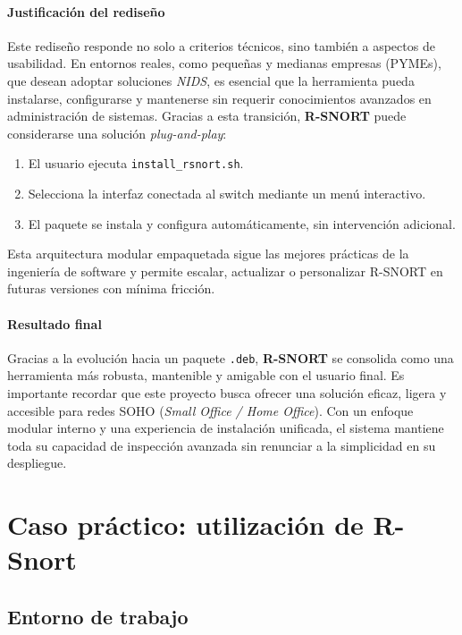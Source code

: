 \documentclass[11pt,a4paper,twoside]{report}
\begin{document}
\subsubsection{Justificación del rediseño}

Este rediseño responde no solo a criterios técnicos, sino también a aspectos de usabilidad. En entornos reales, como pequeñas y medianas empresas (PYMEs), que desean adoptar soluciones \textit{NIDS}, es esencial que la herramienta pueda instalarse, configurarse y mantenerse sin requerir conocimientos avanzados en administración de sistemas. Gracias a esta transición, \textbf{R-SNORT} puede considerarse una solución \textit{plug-and-play}:

\begin{enumerate}
	\item El usuario ejecuta \texttt{install\_rsnort.sh}.
	\item Selecciona la interfaz conectada al switch mediante un menú interactivo.
	\item El paquete se instala y configura automáticamente, sin intervención adicional.
\end{enumerate}

Esta arquitectura modular empaquetada sigue las mejores prácticas de la ingeniería de software y permite escalar, actualizar o personalizar R-SNORT en futuras versiones con mínima fricción.

\subsubsection{Resultado final}

Gracias a la evolución hacia un paquete \texttt{.deb}, \textbf{R-SNORT} se consolida como una herramienta más robusta, mantenible y amigable con el usuario final. Es importante recordar que este proyecto busca ofrecer una solución eficaz, ligera y accesible para redes SOHO (\textit{Small Office / Home Office}). Con un enfoque modular interno y una experiencia de instalación unificada, el sistema mantiene toda su capacidad de inspección avanzada sin renunciar a la simplicidad en su despliegue.



\chapter{Caso práctico: utilización de R-Snort}

\section{Entorno de trabajo}
\end{document}
